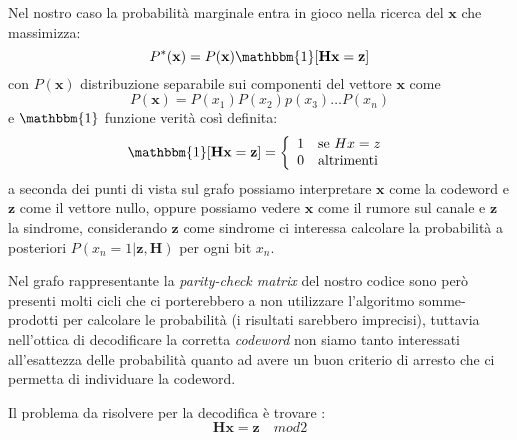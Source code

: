 \documentclass{article}
\begin{document}
	Nel nostro caso la probabilità marginale entra in gioco nella ricerca del $\textbf{x}$ che massimizza:
\begin{equation} 
	P^*(\textbf{x})=P(\textbf{x})\mathbbm{1}[\textbf{Hx} = \textbf{z}]
\end{equation}
con $P(\textbf{x})$ distribuzione separabile sui componenti del vettore $\textbf{x}$ come
\begin{equation*} P(\textbf{x})=P(x_1)P(x_2)p(x_3)\dots P(x_n) \end{equation*}
e $\mathbbm{1}$ funzione verità così definita: 
		\begin{equation*}
			\mathbbm{1}[\textbf{Hx} = \textbf{z}] =
				\left\{
					\begin{array}{ll}
						1  & \mbox{se } Hx=z \\
						0 & \mbox{altrimenti }
					\end{array}
				\right.
		\end{equation*}
		a seconda dei punti di vista sul grafo possiamo interpretare $\textbf{x}$ come la codeword e $\textbf{z}$ come il vettore nullo, oppure possiamo vedere $\textbf{x}$ come il rumore sul canale e $\textbf{z}$ la sindrome, considerando $\textbf{z}$ come sindrome ci interessa calcolare la probabilità a posteriori $P(x_n = 1 | \textbf{z}, \textbf{H})$ per ogni bit $x_n$. 
		
		Nel grafo rappresentante la \textit{parity-check matrix} del nostro codice sono però presenti molti cicli che ci porterebbero a non utilizzare l'algoritmo somme-prodotti per calcolare le probabilità (i risultati sarebbero imprecisi), tuttavia nell'ottica di decodificare la corretta \textit{codeword} non siamo tanto interessati all'esattezza delle probabilità quanto ad avere un buon criterio di arresto che ci permetta di individuare la codeword. 
		
		Il problema da risolvere per la decodifica è trovare :
	\begin{equation}
		\textbf{Hx} = \textbf{z} \quad mod 2
	\end{equation}	

\newpage
\end{document}
